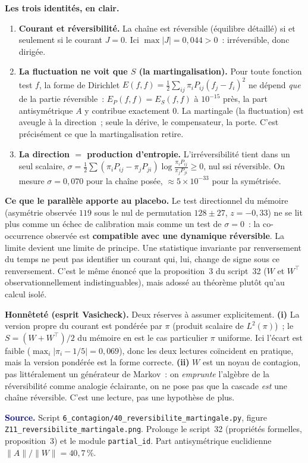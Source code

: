 \documentclass[11pt,a4paper]{article}
\begin{document}
\begin{cle}
\textbf{Les trois identités, en clair.}
\begin{enumerate}\itemsep2pt
\item \textbf{Courant et réversibilité.} La chaîne est réversible (équilibre détaillé) si
et seulement si le courant $J=0$. Ici $\max|J|=0{,}044>0$~: irréversible, donc dirigée.
\item \textbf{La fluctuation ne voit que $S$ (la martingalisation).} Pour toute fonction
test $f$, la forme de Dirichlet $E(f,f)=\tfrac12\sum_{ij}\pi_iP_{ij}(f_j-f_i)^2$ ne dépend
\emph{que} de la partie réversible~: $E_P(f,f)=E_{S}(f,f)$ à $10^{-15}$ près, la part
antisymétrique $A$ y contribue exactement $0$. La martingale (la fluctuation) est aveugle
à la direction~; seule la dérive, le compensateur, la porte. C'est précisément ce que la
martingalisation retire.
\item \textbf{La direction $=$ production d'entropie.} L'irréversibilité tient dans un seul
scalaire, $\sigma=\tfrac12\sum(\pi_iP_{ij}-\pi_jP_{ji})\log\frac{\pi_iP_{ij}}{\pi_jP_{ji}}
\ge 0$, nul ssi réversible. On mesure $\sigma=0{,}070$ pour la chaîne posée, $\approx
5\times10^{-33}$ pour la symétrisée.
\end{enumerate}
\end{cle}

\medskip
\noindent\textbf{Ce que le parallèle apporte au placebo.} Le test directionnel du mémoire
(asymétrie observée $119$ sous le nul de permutation $128\pm27$, $z=-0{,}33$) ne se lit plus
comme un échec de calibration mais comme un test de $\sigma=0$~: la co-occurrence observée
est \textbf{compatible avec une dynamique réversible}. La limite devient une limite de
principe. Une statistique invariante par renversement du temps ne peut pas identifier un
courant qui, lui, change de signe sous ce renversement. C'est le même énoncé que la
proposition~3 du script~32 ($W$ et $W^{\top}$ observationnellement indistinguables), mais
adossé au théorème plutôt qu'au calcul isolé.

\begin{cle}[colback=orange!8,colframe=orange!70!black]
\textbf{Honnêteté (esprit Vasicheck).} Deux réserves à assumer explicitement.
\textbf{(i)} La version propre du courant est pondérée par $\pi$ (produit scalaire de
$L^2(\pi)$)~; le $S=(W+W^{\top})/2$ du mémoire en est le cas particulier $\pi$ uniforme. Ici
l'écart est faible ($\max_i|\pi_i-1/5|=0{,}069$), donc les deux lectures coïncident en
pratique, mais la version pondérée est la forme correcte. \textbf{(ii)} $W$ est un noyau de
contagion, pas littéralement un générateur de Markov~: on \emph{emprunte} l'algèbre de la
réversibilité comme analogie éclairante, on ne pose pas que la cascade \emph{est} une chaîne
réversible. C'est une lecture, pas une hypothèse de plus.
\end{cle}

\smallskip
\noindent\footnotesize\textcolor{navy}{\textbf{Source.}} Script
\texttt{6\_contagion/40\_reversibilite\_martingale.py}, figure
\texttt{Z11\_reversibilite\_martingale.png}. Prolonge le script~32 (propriétés formelles,
proposition~3) et le module \texttt{partial\_id}. Part antisymétrique euclidienne
$\lVert A\rVert/\lVert W\rVert=40{,}7\,\%$.
\end{document}
